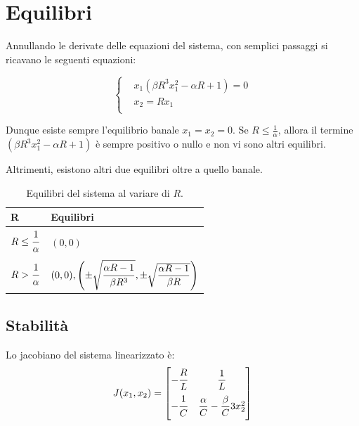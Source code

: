 \section{Equilibri}
Annullando le derivate delle equazioni del sistema, con semplici passaggi si ricavano le seguenti equazioni:

\begin{equation}
\left\{
\begin{aligned}
    &x_1 ( \beta R^3 x_1^2 - \alpha R + 1) = 0\\
    &x_2 = R x_1\\
\end{aligned}
\right.
\end{equation}

Dunque esiste sempre l'equilibrio banale $x_1 = x_2 = 0$.
Se $R \le \frac{1}{\alpha}$, allora il termine $( \beta R^3 x_1^2 - \alpha R + 1)$ è sempre positivo o nullo e non vi sono altri equilibri.

Altrimenti, esistono altri due equilibri oltre a quello banale.

\begin{table}
    \centering
    \begin{tabular}{l | l}
        \textbf{R} & \textbf{Equilibri}\\
        \hline
        $R \le \dfrac{\strut 1}{\strut\alpha}$ & $(0, 0)$\\
        $R > \dfrac{\strut 1}{\strut\alpha}$ & $(0,0),
        \left( \pm \sqrt{\dfrac{\strut\alpha R -1}{\strut\beta R^3}}, \pm \sqrt{\dfrac{\alpha R -1}{\beta R}} \right)$
    \end{tabular}
    \caption{Equilibri del sistema al variare di $R$.}
\end{table}

\subsection{Stabilità}
Lo jacobiano del sistema linearizzato è:
\begin{equation}
J(x_1,x_2) =
\begin{bmatrix}
-\dfrac{\strut R}{L\strut} & \dfrac{1}{L} \\
-\dfrac{\strut 1}{C\strut} & \dfrac{\alpha}{C}-\dfrac{\beta}{C} 3x_2^2 \\
\end{bmatrix}
\end{equation}

